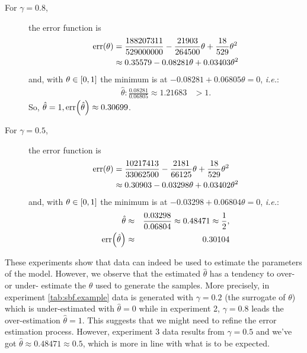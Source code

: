 \documentclass[a4paper]{article}
\newcommand{\at}[1]{\ensuremath{\!\del{#1}}}        %
\newcommand{\err}[1]{\ensuremath{\mathrm{err}\at{#1}}}
\begin{document}
\begin{description}
    \item[For \(\gamma=0.8\),] the error function is \begin{align*}
              \err{\theta} & = \frac{188207311}{529000000} - \frac{21903}{264500} \theta + \frac{18}{529} \theta^{2} \\
                           & \approx 0.35579 - 0.08281 \theta + 0.03403 \theta ^2\end{align*}
          and, with \(\theta\in\intcc{0, 1}\) the minimum is at $-0.08281 +
              0.06805 \theta = 0$, \emph{i.e.}:
          \begin{eqnarray*}
              \hat{\theta} : \frac{0.08281}{0.06805} \approx 1.21683& >1.
          \end{eqnarray*}
          So, \(\hat{\theta} = 1, \err{\hat{\theta}} \approx  0.30699\).

    \item[For \(\gamma=0.5\),] the error function is \begin{align*}
              \err{\theta} & = \frac{10217413}{33062500} - \frac{2181}{66125} \theta + \frac{18}{529} \theta^{2} \\
                           & \approx 0.30903 - 0.03298 \theta + 0.03402 \theta ^2\end{align*}
          and, with \(\theta\in\intcc{0, 1}\) the minimum is at $-0.03298 +
              0.06804 \theta = 0$, \emph{i.e.}:
          \begin{eqnarray*}
              \hat{\theta}        &\approx &
              \frac{0.03298}{0.06804}
              \approx 0.48471 \approx \frac{1}{2}, \\
              \err{\hat{\theta}}  &\approx & 0.30104 \end{eqnarray*}

\end{description}

These experiments show that data can indeed be used to estimate the
parameters of the model.  However, we observe that the estimated
\(\hat{\theta}\) has a tendency to over- or under- estimate the
\(\theta\) used to generate the samples.  More precisely, in
experiment \ref{tab:sbf.example} data is generated with
\(\gamma = 0.2\) (the surrogate of \(\theta\)) which is
under-estimated with \(\hat{\theta} = 0\) while in experiment 2,
\(\gamma = 0.8\) leads the over-estimation \(\hat{\theta} = 1\).  This
suggests that we might need to refine the error estimation process.
However, experiment 3 data results from $\gamma = 0.5$ and we've got
\(\hat{\theta} \approx 0.48471 \approx 0.5\), which is more in line
with what is to be expected.
%
%
%
\end{document}
